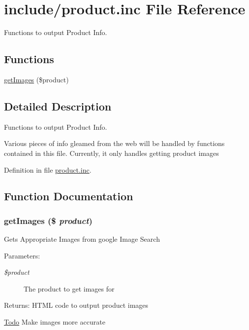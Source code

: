 \hypertarget{product_8inc}{
\section{include/product.inc File Reference}
\label{product_8inc}
}
Functions to output Product Info. 

\subsection*{Functions}
\begin{CompactItemize}
\item 
\hyperlink{product_8inc_9dbb778854cfe105058d7161ca8f058c}{getImages} (\$product)
\end{CompactItemize}


\subsection{Detailed Description}
Functions to output Product Info. 

Various pieces of info gleamed from the web will be handled by functions contained in this file. Currently, it only handles getting product images 

Definition in file \hyperlink{product_8inc-source}{product.inc}.

\subsection{Function Documentation}
\hypertarget{product_8inc_9dbb778854cfe105058d7161ca8f058c}{
\subsubsection{\setlength{\rightskip}{0pt plus 5cm}getImages (\$ {\em product})}}
\label{product_8inc_9dbb778854cfe105058d7161ca8f058c}


Gets Appropriate Images from google Image Search \begin{Desc}
\item[Parameters:]
\begin{description}
\item[{\em \$product}]The product to get images for \end{description}
\end{Desc}
\begin{Desc}
\item[Returns:]HTML code to output product images \end{Desc}
\begin{Desc}
\item[\hyperlink{todo__todo000001}{Todo}]Make images more accurate \end{Desc}


